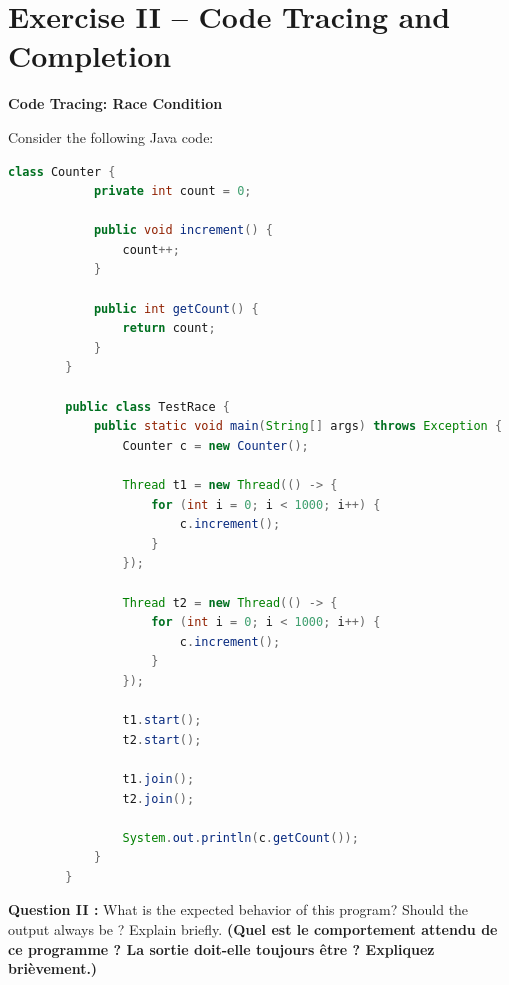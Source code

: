 \documentclass[11pt,a4paper]{article}
\DeclareRobustCommand{\code}[1]{\texttt{\detokenize{#1}}}
\begin{document}
	\section*{Exercise II -- Code Tracing and Completion}
	
	\textbf{Code Tracing: Race Condition}
	
	Consider the following Java code:
	
	\begin{lstlisting}[language=Java]
		class Counter {
			private int count = 0;
			
			public void increment() {
				count++;
			}
			
			public int getCount() {
				return count;
			}
		}
		
		public class TestRace {
			public static void main(String[] args) throws Exception {
				Counter c = new Counter();
				
				Thread t1 = new Thread(() -> {
					for (int i = 0; i < 1000; i++) {
						c.increment();
					}
				});
				
				Thread t2 = new Thread(() -> {
					for (int i = 0; i < 1000; i++) {
						c.increment();
					}
				});
				
				t1.start();
				t2.start();
				
				t1.join();
				t2.join();
				
				System.out.println(c.getCount());
			}
		}
	\end{lstlisting}
	
\textbf{Question II :}  
What is the expected behavior of this program? Should the output always be \code{2000}? Explain briefly.
\textbf{(Quel est le comportement attendu de ce programme ? La sortie doit-elle toujours être \code{2000} ? Expliquez brièvement.)}\vspace{12pt}
	
\end{document}
